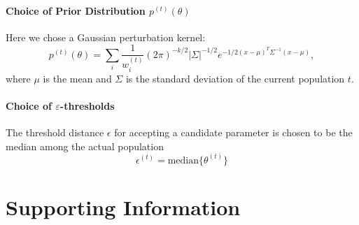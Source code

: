 \documentclass[10pt,letterpaper]{article}
\begin{document}
{\color{red}
\paragraph{Choice of Prior Distribution $p^{(t)}(\theta)$}
Here we chose a Gaussian perturbation kernel:
\begin{equation}
	p^{(t)}(\theta) = \sum_{i}\frac{1}{w^{(t)}_{i}} (2\pi)^{-k/2} |\Sigma|^{-1/2}e^{-1/2(x-\mu)^{T}\Sigma^{-1}(x-\mu)},
\end{equation}
where $\mu$ is the mean and $\Sigma$ is the standard deviation of the current population $t$.
\paragraph{Choice of $\varepsilon$-thresholds} The threshold distance $\epsilon$ for accepting a candidate parameter is chosen to be the median among the actual population 
\begin{equation}
	\epsilon^{(t)} = \text{median} \{ \theta^{(t)} \}
\end{equation}
}





\section*{Supporting Information}
\end{document}

